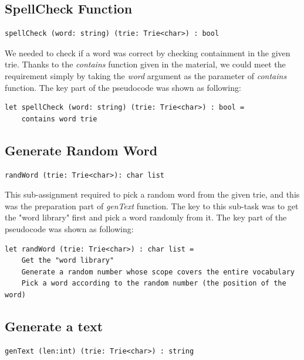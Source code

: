 \documentclass{article}
\begin{document}
\subsection{SpellCheck Function}\label{sec:spellcheck}
\begin{lstlisting}
spellCheck (word: string) (trie: Trie<char>) : bool
\end{lstlisting}

We needed to check if a word was correct by checking containment in the given trie. Thanks to the \emph{contains} function given in the material, we could meet the requirement simply by taking the \emph{word} argument as the parameter of \emph{contains} function. The key part of the pseudocode was shown as following:

\begin{lstlisting}
let spellCheck (word: string) (trie: Trie<char>) : bool = 
    contains word trie
\end{lstlisting}

\subsection{Generate Random Word}\label{sec:randword}
\begin{lstlisting}
randWord (trie: Trie<char>): char list
\end{lstlisting}

This sub-assignment required to pick a random word from the given trie, and this was the preparation part of \emph{genText} function. The key to this sub-task was to get the "word library" first and pick a word randomly from it. The key part of the pseudocode was shown as following:

\begin{lstlisting}
let randWord (trie: Trie<char>) : char list = 
    Get the "word library"
    Generate a random number whose scope covers the entire vocabulary
    Pick a word according to the random number (the position of the word)
\end{lstlisting}

\subsection{Generate a text}\label{sec:gentext}
\begin{lstlisting}
genText (len:int) (trie: Trie<char>) : string
\end{lstlisting}
\end{document}
